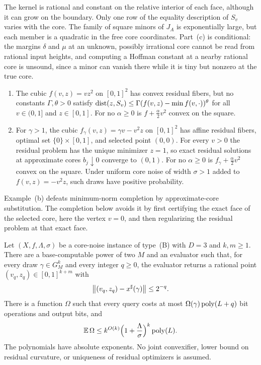 The kernel is rational and constant on the relative interior of each
face, although it can grow on the boundary. Only one row of the
equality description of $S_v$ varies with the core. The family of
square minors of $J_A$ is exponentially large, but each member is a
quadratic in the free core coordinates. Part~(c) is conditional: the
margins $\delta$ and $\mu$ at an unknown, possibly irrational core
cannot be read from rational input heights, and computing a Hoffman
constant at a nearby rational core is unsound, since a minor can vanish
there while it is tiny but nonzero at the true core.

\begin{proposition}
\label{prop:recourse-examples}
\begin{enumerate}[label=(\alph*)]
\item The cubic $f(v,z)=vz^2$ on $[0,1]^2$ has convex residual fibers,
but no constants $\Gamma,\theta>0$ satisfy
$\operatorname{dist}(z,S_v)\le\Gamma(f(v,z)-\min f(v,\cdot))^\theta$ for all
$v\in(0,1]$ and $z\in[0,1]$. For no $\alpha\ge0$ is
$f+\frac\alpha2v^2$ convex on the square.
\item For $\gamma>1$, the cubic $f_\gamma(v,z)=\gamma v-v^2z$ on
$[0,1]^2$ has affine residual fibers, optimal set $\{0\}\times[0,1]$,
and selected point $(0,0)$. For every $v>0$ the residual problem has
the unique minimizer $z=1$, so exact residual solutions at approximate
cores $b_j\downarrow0$ converge to $(0,1)$. For no $\alpha\ge0$ is
$f_\gamma+\frac\alpha2v^2$ convex on the square. Under uniform core
noise of width $\sigma>1$ added to $f(v,z)=-v^2z$, such draws have
positive probability.
\end{enumerate}
\end{proposition}

Example~(b) defeats minimum-norm completion by approximate-core
substitution. The completion below avoids it by first certifying the
exact face of the selected core, here the vertex $v=0$, and then
regularizing the residual problem at that exact face.

\begin{theorem}
\label{thm:recourse-cubic}
Let $(X,f,\Lambda,\sigma)$ be a core-noise instance of type~(B) with
$D=3$ and $k,m\ge1$. There are a base-computable power of two $M$ and
an evaluator such that, for every draw $\gamma\in G_M^k$ and every
integer $q\ge0$, the evaluator returns a rational point
$(v_q,z_q)\in[0,1]^{k+m}$ with
\[
 \left\lVert(v_q,z_q)-x^\sharp(\gamma)\right\rVert\le2^{-q}.
\]
There is a function $\Omega$ such that every query costs at most
$\Omega(\gamma)\operatorname{poly}(L+q)$ bit operations and output bits, and
\[
 \mathbb E\,\Omega\le k^{O(k)}\Bigl(1+\frac\Lambda\sigma\Bigr)^k\operatorname{poly}(L).
\]
The polynomials have absolute exponents. No joint convexifier, lower
bound on residual curvature, or uniqueness of residual optimizers is
assumed.
\end{theorem}

